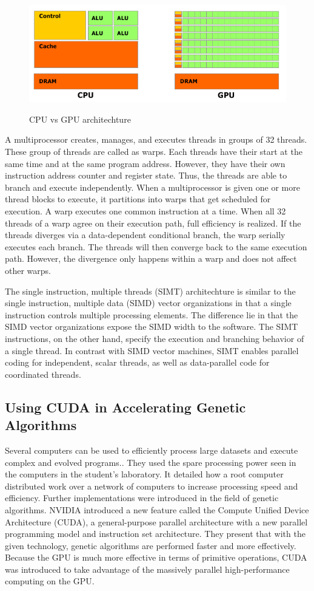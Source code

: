 \begin{figure}
	\centering
		\graphicspath{{images/}}
		\includegraphics[width=190 pt]{cpu_gpu_blackandwhite.png}
	\caption{CPU vs GPU architechture}
	\cite{pdf:NVCudaPrgGuide}
	\label{fig:gpu_diagram}
\end{figure}
\bigskip

A multiprocessor creates, manages, and executes threads in groups of 32
threads\cite{pdf:NVCudaPrgGuide}. 
These group of threads are called as warps. Each threads have their start at the same 
time and at the same program address. However, they have their own instruction address 
counter and register state. Thus, the threads are able to branch and execute independently.
When a multiprocessor is given one or more thread blocks to execute, it partitions into warps 
that get scheduled for execution. A warp executes one common instruction at a time. When
all 32 threads of a warp agree on their execution path, full efficiency is realized. If the threads
diverges via a data-dependent conditional branch, the warp serially executes each branch.
The threads will then converge back to the same execution path.  However, the divergence only
happens within a warp and does not affect other warps.

The single instruction, multiple threads (SIMT) architechture is similar to the single instruction,
multiple data (SIMD) vector organizations in that a single instruction controls multiple processing
elements\cite{pdf:NVCudaPrgGuide}. The difference lie in that the SIMD vector
organizations expose the SIMD width to the software. The SIMT instructions, on
the other hand, specify the execution and branching behavior of a single thread.
In contrast with SIMD vector machines, SIMT enables parallel coding for
independent, scalar threads, as well as data-parallel code for 
coordinated threads. 
	
\subsection{Using CUDA in Accelerating Genetic Algorithms}
Several computers can be used to efficiently process large datasets and execute complex
and evolved programs.\cite{Harding09}. They used the spare processing power seen in the
computers in the student's laboratory. It detailed how a root computer distributed work
over a network of computers to increase processing speed and efficiency. Further
implementations were introduced in the field of genetic algorithms. NVIDIA introduced a new 
feature called the Compute Unified Device Architecture (CUDA),
a general-purpose parallel architecture with a new parallel programming model and instruction
set architecture\cite{Zhang09}. They present that with the given technology, genetic algorithms
are performed faster and more effectively. Because the GPU is much more effective in terms of primitive
operations, CUDA was introduced to take advantage of the massively parallel high-performance
computing on the GPU.  

